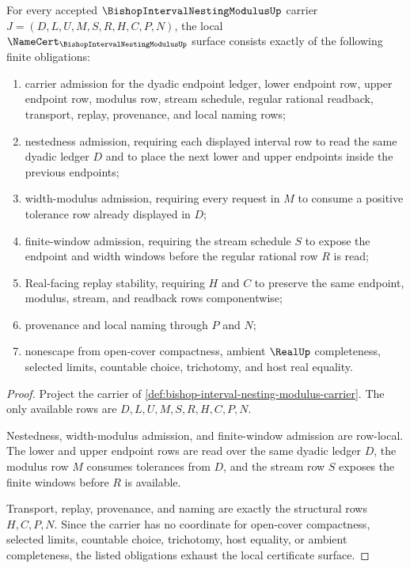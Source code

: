 \begin{theorem}
\label{thm:bishop-interval-nesting-modulus-namecert-obligations}
For every accepted $\BishopIntervalNestingModulusUp$ carrier $J=(D,L,U,M,S,R,H,C,P,N)$, the local $\NameCert_{\BishopIntervalNestingModulusUp}$ surface consists exactly of the following finite obligations:
\begin{enumerate}
\item carrier admission for the dyadic endpoint ledger, lower endpoint row, upper endpoint row, modulus row, stream schedule, regular rational readback, transport, replay, provenance, and local naming rows;
\item nestedness admission, requiring each displayed interval row to read the same dyadic ledger $D$ and to place the next lower and upper endpoints inside the previous endpoints;
\item width-modulus admission, requiring every request in $M$ to consume a positive tolerance row already displayed in $D$;
\item finite-window admission, requiring the stream schedule $S$ to expose the endpoint and width windows before the regular rational row $R$ is read;
\item Real-facing replay stability, requiring $H$ and $C$ to preserve the same endpoint, modulus, stream, and readback rows componentwise;
\item provenance and local naming through $P$ and $N$;
\item nonescape from open-cover compactness, ambient $\RealUp$ completeness, selected limits, countable choice, trichotomy, and host real equality.
\end{enumerate}
\end{theorem}
\begin{proof}
Project the carrier of \autoref{def:bishop-interval-nesting-modulus-carrier}. The only available rows are $D,L,U,M,S,R,H,C,P,N$.

Nestedness, width-modulus admission, and finite-window admission are row-local. The lower and upper endpoint rows are read over the same dyadic ledger $D$, the modulus row $M$ consumes tolerances from $D$, and the stream row $S$ exposes the finite windows before $R$ is available.

Transport, replay, provenance, and naming are exactly the structural rows $H,C,P,N$. Since the carrier has no coordinate for open-cover compactness, selected limits, countable choice, trichotomy, host equality, or ambient completeness, the listed obligations exhaust the local certificate surface.
\end{proof}

